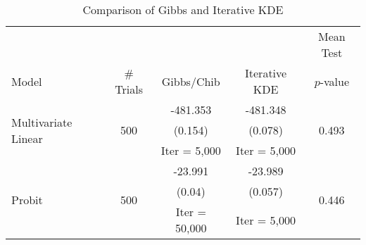\begin{table*}
\centering
\begin{tabular}{l|c|c|c|c}
   &  &  &  & Mean Test \\ 
  Model & \# Trials & Gibbs/Chib & Iterative KDE & $p$-value \\ 
   \hline
\hline
\multirow{3}{*}{Multivariate Linear} & \multirow{3}{*}{500} & -481.353 & -481.348 & \multirow{3}{*}{0.493} \\ 
   &  & (0.154) & (0.078) &  \\ 
   &  & Iter = 5,000 & Iter = 5,000 &  \\ 
   \hline
\multirow{3}{*}{Probit} & \multirow{3}{*}{500} & -23.991 & -23.989 & \multirow{3}{*}{0.446} \\ 
   &  & (0.04) & (0.057) &  \\ 
   &  & Iter = 50,000 & Iter = 5,000 &  \\ 
   \hline
\end{tabular}
\caption{Comparison of Gibbs and Iterative KDE} 
\label{tab:MVN-Probit}
\end{table*}
